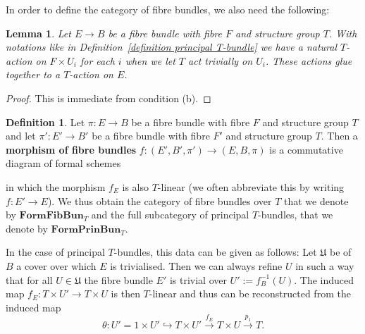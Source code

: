 \documentclass[10pt,oneside]{amsart}
\newtheorem{lemma}[theorem]{Lemma}
\theoremstyle{definition}
\newtheorem{definition}[theorem]{Definition}
\begin{document}
	In order to define the category of  fibre bundles, we also need the following:
	\begin{lemma}
		Let $E\rightarrow B$ be a fibre bundle with fibre $F$ and structure group $T$. With notations like in Definition~\ref{definition principal T-bundle} we have a natural $T$-action on $F\times U_{i}$ for each $i$ when we let $T$ act trivially on $U_{i}$. These actions glue together to a $T$-action on $E$.
	\end{lemma}
	\begin{proof}
		This is immediate from condition (b).
	\end{proof}
	\begin{definition}
		Let $\pi:E\rightarrow B$ be a fibre bundle with fibre $F$ and structure group $T$ and let $\pi':E'\rightarrow B'$ be a fibre bundle with fibre $F'$ and structure group $T$. Then a \textbf{morphism of fibre bundles} $f:(E',B',\pi')\rightarrow (E,B,\pi)$ is a commutative diagram of formal schemes
		\begin{center}
		\end{center}
		in which the morphism $f_E$ is also $T$-linear (we often abbreviate this by writing $f:E'\rightarrow E$). We thus obtain the category of fibre bundles over $T$ that we denote by $\mathbf{FormFibBun}_T$ and the full subcategory of principal $T$-bundles, that we denote by $\mathbf{FormPrinBun}_T$.
	\end{definition}
	
	In the case of principal $T$-bundles, this data can be given as follows: Let $\mathfrak U$ be of $B$ a cover over which $E$ is trivialised. Then we can always refine $U$ in such a way that for all $U\in \mathfrak{U}$ the fibre bundle $E'$ is trivial over $U':=f_B^{-1}(U)$. The induced map $f_E:T\times U'\rightarrow T\times U$ is then $T$-linear and thus can be reconstructed from the induced map
	\[\theta:U'=1\times U'\hookrightarrow T\times U'\xrightarrow{f_E} T\times U\xrightarrow{p_1} T.\]
	
\end{document}
